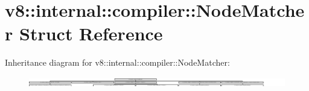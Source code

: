 \hypertarget{structv8_1_1internal_1_1compiler_1_1NodeMatcher}{}\section{v8\+:\+:internal\+:\+:compiler\+:\+:Node\+Matcher Struct Reference}
\label{structv8_1_1internal_1_1compiler_1_1NodeMatcher}
Inheritance diagram for v8\+:\+:internal\+:\+:compiler\+:\+:Node\+Matcher\+:\begin{figure}[H]
\begin{center}
\leavevmode
\includegraphics[height=0.441640cm]{structv8_1_1internal_1_1compiler_1_1NodeMatcher}
\end{center}
\end{figure}
